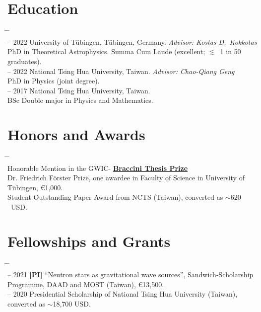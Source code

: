 \documentclass[10pt,floatfix,a4paper]{article}
\begin{document}
\section*{Education}
\begin{tabbing}
  \hspace*{5mm} \= \hspace*{2.3cm} \= \hspace*{10cm} \\[-3ex]
   -- 2022 \>  University of T{\"u}bingen, T\"ubingen, Germany. \textit{Advisor: Kostas D.~Kokkotas} \\
  \> \> PhD in Theoretical Astrophysics.  Summa Cum Laude (excellent;  $\lesssim$~1 in 50 graduates). \\[1ex]
   -- 2022 \> National Tsing Hua University, Taiwan. \textit{Advisor: Chao-Qiang Geng} \\
  \> \> PhD in Physics (joint degree). \\[1ex]
   -- 2017 \> National Tsing Hua University, Taiwan. \\
  \> \> BSc Double major in Physics and Mathematics.
\end{tabbing}

\section*{Honors and Awards}
\begin{tabbing}
  \hspace*{5mm} \= \hspace*{2.3cm} \= \hspace*{10cm} \\[-3ex]
  \> Honorable Mention in the GWIC-\textbf{ \href{https://gwic.ligo.org/thesis-prize.html}{Braccini Thesis Prize} } \\
  \> Dr. Friedrich F{\"o}rster Prize, one awardee in Faculty of Science in University of T{\"u}bingen, \euro{1,000}. \\
  \> Student Outstanding Paper Award from NCTS (Taiwan), converted as $\sim620$~USD.
\end{tabbing}

\section*{Fellowships and Grants}
\begin{tabbing}
  \hspace*{5mm} \= \hspace*{2.3cm} \= \hspace*{10cm} \\[-3ex]
   -- 2021 \> \textbf{[PI]} ``Neutron stars as gravitational wave sources'', Sandwich-Scholarship\\
  \> \> Programme, DAAD and MOST (Taiwan), \euro{13,500}. \\
   -- 2020 \> Presidential Scholarship of National Tsing Hua University (Taiwan), converted as $\sim$18,700 USD.
\end{tabbing}
\end{document}
